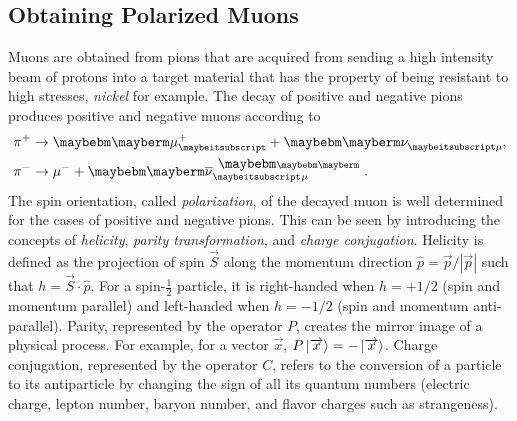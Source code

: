 \documentclass{outhesis}
\begin{document}
\subsection{Obtaining Polarized Muons}

Muons are obtained from pions that are acquired from sending a high intensity beam of protons into a target material that has the property of being resistant to high stresses, \emph{nickel} for example. The decay of positive and negative pions produces positive and negative muons according to 
\begin{equation}
\begin{split}
&\pi^+ \rightarrow \HepParticle{\mu}{}{+} +\HepParticle{\nu}{\mu}{},\\
&\pi^- \rightarrow \mu^- + \HepAntiParticle{\nu}{\mu}{}.
\end{split}
\end{equation}
The spin orientation, called \emph{polarization},  of the decayed muon is well determined for the cases of positive and negative pions. This can be seen by introducing the concepts of \emph{helicity}, \emph{parity transformation}, and \emph{charge conjugation}. Helicity is defined as the projection of spin $\overrightarrow{S}$ along the momentum direction $\hat{p} = \overrightarrow{p}/|\overrightarrow{p}|$ such that $h = \overrightarrow{S}\cdot \hat{p}$. For a spin-$\frac{1}{2}$ particle, it is right-handed when $h=+1/2$ (spin and momentum parallel) and left-handed when $h=-1/2$ (spin and momentum anti-parallel). Parity, represented by the operator $P$, creates the mirror image of a physical process. For example, for a vector $\overrightarrow{x}$, $P\ket{\overrightarrow{x}} = -\ket{\overrightarrow{x}}$. Charge conjugation, represented by the operator $C$, refers to the conversion of a particle to its antiparticle by changing the sign of all its quantum numbers (electric charge, lepton number, baryon number, and flavor charges such as strangeness). 
\end{document}
